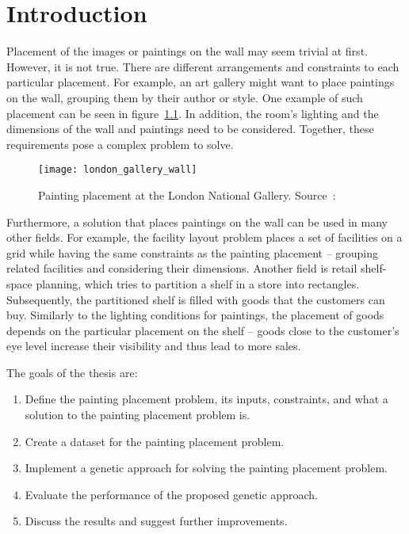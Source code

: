 \chapter{Introduction}\label{ch:introduction}

Placement of the images or paintings on the wall may seem trivial at first.
However, it is not true.
There are different arrangements and constraints to each particular placement.
For example, an art gallery might want to place paintings on the wall, grouping them by their author or style.
One example of such placement can be seen in figure~\ref{fig:london-wall}.
In addition, the room's lighting and the dimensions of the wall and paintings need to be considered.
Together, these requirements pose a complex problem to solve.

\begin{figure}[]
    \texttt{[image: london\_gallery\_wall]}
    \caption[Painting placement at the London National Gallery]{Painting placement at the London National Gallery. Source~\cite{ScreenshotWallGoogle}:}
    \label{fig:london-wall}
\end{figure}


Furthermore, a solution that places paintings on the wall can be used in many other fields.
For example, the facility layout problem places a set of facilities on a grid
while having the same constraints as the painting placement – grouping related facilities and considering their dimensions.
Another field is retail shelf-space planning, which tries to partition a shelf in a store into rectangles.
Subsequently, the partitioned shelf is filled with goods that the customers can buy.
Similarly to the lighting conditions for paintings, the placement of goods depends on the
particular placement on the shelf – goods close to the customer's eye level increase their visibility and thus lead to more sales.

The goals of the thesis are:

\begin{enumerate}
    \item Define the painting placement problem, its inputs, constraints, and what a solution to the painting placement problem is.
    \item Create a dataset for the painting placement problem.
    \item Implement a genetic approach for solving the painting placement problem.
    \item Evaluate the performance of the proposed genetic approach.
    \item Discuss the results and suggest further improvements.
\end{enumerate}

